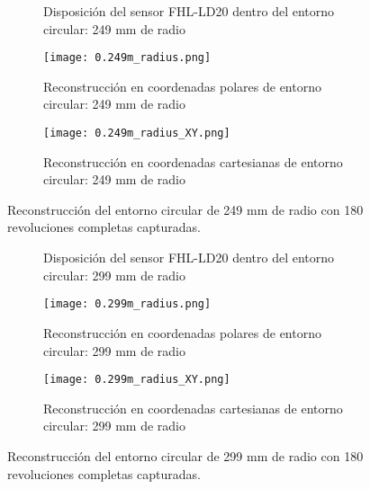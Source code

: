 \begin{figure}[H]
	\centering
	\begin{subfigure}{\textwidth}
		\centering
		\caption{Disposición del sensor FHL-LD20 dentro del entorno circular: 249 mm de radio}
		\label{fig:disposicion_lidar_var3}
		\vspace{1em}
	\end{subfigure}
	\begin{subfigure}{0.45\textwidth}
		\centering
		\texttt{[image: 0.249m\_radius.png]}
		\caption{Reconstrucción en coordenadas polares de entorno circular: 249 mm de radio}
		\label{fig:249m_radius_xy}
	\end{subfigure}
	\hspace{1em}
	\begin{subfigure}{0.45\textwidth}
		\centering
		\texttt{[image: 0.249m\_radius\_XY.png]}
		\caption{Reconstrucción en coordenadas cartesianas de entorno circular: 249 mm de radio}
		\label{fig:249m_radius}
	\end{subfigure}
	\caption{Reconstrucción del entorno circular de 249 mm de radio con 180 revoluciones completas capturadas.}
	\label{fig:disposicion_lidar_var_dist3}
\end{figure}

\begin{figure}[H]
	\centering
	\begin{subfigure}{\textwidth}
		\centering
		\caption{Disposición del sensor FHL-LD20 dentro del entorno circular: 299 mm de radio}
		\label{fig:disposicion_lidar_var4}
		\vspace{1em}
	\end{subfigure}
	\begin{subfigure}{0.45\textwidth}
		\centering
		\texttt{[image: 0.299m\_radius.png]}
		\caption{Reconstrucción en coordenadas polares de entorno circular: 299 mm de radio}
		\label{fig:299m_radius_xy}
	\end{subfigure}
	\hspace{1em}
	\begin{subfigure}{0.45\textwidth}
		\centering
		\texttt{[image: 0.299m\_radius\_XY.png]}
		\caption{Reconstrucción en coordenadas cartesianas de entorno circular: 299 mm de radio}
		\label{fig:299m_radius}
	\end{subfigure}
	\caption{Reconstrucción del entorno circular de 299 mm de radio con 180 revoluciones completas capturadas.}
	\label{fig:disposicion_lidar_var_dist4}
\end{figure}

